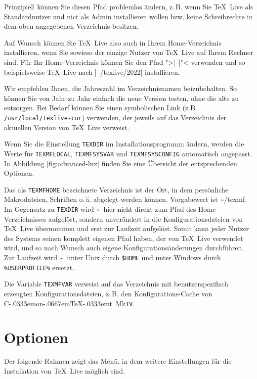 \documentclass[12pt,ngerman,a4paper,fullparskip]{report}
\newcommand{\TL}{\TeX\ Live\xspace}
\newcommand{\acro}[1]{\texttt{#1}}
\newcommand{\dirname}[1]{\texttt{#1}}
\newcommand\ConTeXt{C\kern-.0333emon\-\kern-.0667em\TeX\kern-.0333emt}
\begin{document}
Prinzipiell können Sie diesen Pfad problemlos ändern, z.\,B. wenn Sie \TL als Standardnutzer und nict als Admin installieren wollen bzw. keine Schreibrechte in dem oben angegebenen Verzeichnis besitzen.

Auf Wunsch können Sie \TL also auch in Ihrem Home-Verzeichnis installieren, wenn Sie sowieso der einzige Nutzer von \TL auf Ihrem Rechner sind. Für Ihr Home-Verzeichnis können Sie den Pfad ">|~|"< verwenden und so beispielsweise \TL nach  |~/texlive/2022| installieren.

Wir empfehlen Ihnen, die Jahreszahl im Verzeichnisnamen beizubehalten. So können Sie von Jahr zu Jahr einfach die neue Version testen, ohne die alte zu entsorgen. Bei Bedarf können Sie einen symbolischen
Link (z.B. \dirname{/usr/local/texlive-cur}) verwenden, der jeweils auf das Verzeichnis der aktuellen Version von \TL verweist.

Wenn Sie die Einstellung \dirname{TEXDIR} im Installationsprogramm ändern, werden die Werte für
\dirname{TEXMFLOCAL}, \dirname{TEXMFSYSVAR} und \dirname{TEXMFSYSCONFIG} automatisch angepasst. In Abbildung \ref{fig:advanced-lnx} finden Sie eine Übersicht der entsprechenden Optionen.

Das als \dirname{TEXMFHOME} bezeichnete Verzeichnis ist der Ort, in dem persönliche Makrodateien,
Schriften o.\,ä. abgelegt werden können. Vorgabewert ist \textasciitilde/texmf. Im Gegensatz zu \dirname{TEXDIR} wird \textasciitilde\ hier nicht direkt zum Pfad des Home-Verzeichnisses aufgelöst, sondern unverändert in die Konfigurationsdateien von \TL übernommen und erst zur Laufzeit aufgelöst. Somit kann jeder Nutzer des Systems seinen komplett eigenen Pfad haben, der von \TL verwendet wird, und so nach Wunsch auch eigene Konfigurationsänderungen durchführen. Zur Laufzeit wird \textasciitilde\ unter Unix durch \dirname{\$HOME} und unter Windows durch \verb|%USERPROFILE%| ersetzt.

Die Variable \dirname{TEXMFVAR} verweist auf das Verzeichnis mit benutzerspezifisch
erzeugten Konfigurationsdateien, z.\,B. den Konfigurations-Cache von \ConTeXt\ Mk\acro{IV}.

\clearpage

\section{Optionen}\label{sec:options}

Der folgende Rahmen zeigt das Menü, in dem weitere Einstellungen für die Installation von \TL möglich sind.
\end{document}
